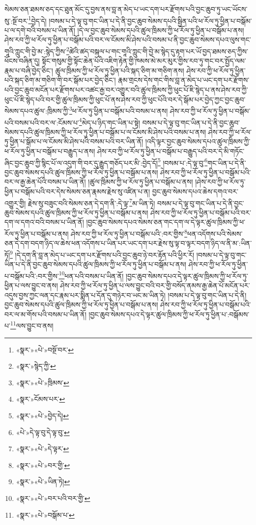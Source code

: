 སེམས་ཅན་ཐམས་ཅད་དང་ཐུན་མོང་དུ་བྱས་ནས་བླ་ན་མེད་པ་ཡང་དག་པར་རྫོགས་པའི་བྱང་ཆུབ་ཏུ་ཡང་ཡོངས་སུ་:སྔོ་བར་\footnote{«སྣར་»«པེ་»བསྔོ་བར་}བྱེད་དེ། །བསམ་པ་དེ་ལྟ་བུ་གང་ཡིན་པ་དེ་ནི་བྱང་ཆུབ་སེམས་དཔའི་སྦྱིན་པའི་ཕ་རོལ་ཏུ་ཕྱིན་པ་བསྒོམ་པ་ལ་དགེ་བའི་བསམ་པ་ཡིན་ནོ། །དེ་ལ་བྱང་ཆུབ་སེམས་དཔའི་ཚུལ་ཁྲིམས་ཀྱི་ཕ་རོལ་ཏུ་ཕྱིན་པ་བསྒོམ་པ་ནས། ཤེས་རབ་ཀྱི་ཕ་རོལ་ཏུ་ཕྱིན་པ་བསྒོམ་པའི་བར་ལ་ངོམས་མི་ཤེས་པའི་བསམ་པ་ནི་བྱང་ཆུབ་སེམས་དཔའ་ལུས་གང་གཱའི་ཀླུང་གི་བྱེ་མ་:སྙེད་ཀྱིས་\footnote{«སྣར་»སྙེད་ཀྱི་}ཚེའི་ཚད་བསྐལ་པ་གང་གཱའི་ཀླུང་གི་བྱེ་མ་སྙེད་དུ་རྟག་པར་ཡོ་བྱད་ཐམས་ཅད་ཀྱིས་ཕོངས་བཞིན་དུ། སྟོང་གསུམ་གྱི་སྟོང་ཆེན་པོའི་འཇིག་རྟེན་གྱི་ཁམས་མེ་མར་མུར་གྱིས་རབ་ཏུ་གང་བར་སྤྱོད་ལམ་རྣམ་པ་བཞི་བྱེད་ཅིང་། ཚུལ་ཁྲིམས་ཀྱི་ཕ་རོལ་ཏུ་ཕྱིན་པའི་སྐད་ཅིག་མ་གཅིག་ནས། ཤེས་རབ་ཀྱི་ཕ་རོལ་ཏུ་ཕྱིན་པའི་སྐད་ཅིག་མ་གཅིག་གི་བར་སྒོམ་པར་བྱེད་ཅིང་། རྣམ་གྲངས་དེས་གང་གིས་བླ་ན་མེད་པ་ཡང་དག་པར་རྫོགས་པའི་བྱང་ཆུབ་མངོན་པར་རྫོགས་པར་འཚང་རྒྱ་བར་འགྱུར་བའི་ཚུལ་ཁྲིམས་ཀྱི་ཕུང་པོ་ཇི་སྙེད་པ་ནས་ཤེས་རབ་ཀྱི་ཕུང་པོ་ཇི་སྙེད་པའི་བར་གྱི་ཚུལ་ཁྲིམས་ཀྱི་ཕུང་པོ་ནས་ཤེས་རབ་ཀྱི་ཕུང་པོའི་བར་དེ་སྒོམ་པར་བྱེད་ཀྱང་བྱང་ཆུབ་སེམས་དཔའ་ཚུལ་:ཁྲིམས་ཀྱི་\footnote{«སྣར་»«པེ་»ཁྲིམས་}ཕ་རོལ་ཏུ་ཕྱིན་པ་བསྒོམ་པའི་བསམ་པ་ནས། ཤེས་རབ་ཀྱི་ཕ་རོལ་ཏུ་ཕྱིན་པ་བསྒོམ་པའི་བསམ་པའི་བར་ལ་:ངོམས་པ་\footnote{«སྣར་»ངོམས་པར་}མེད་པ་ཉིད་གང་ཡིན་པ་སྟེ། བསམ་པ་དེ་ལྟ་བུ་གང་ཡིན་པ་དེ་ནི་བྱང་ཆུབ་སེམས་དཔའི་ཚུལ་ཁྲིམས་ཀྱི་ཕ་རོལ་ཏུ་ཕྱིན་པ་བསྒོམ་པ་ལ་ངོམས་མི་ཤེས་པའི་བསམ་པ་ནས། ཤེས་རབ་ཀྱི་ཕ་རོལ་ཏུ་ཕྱིན་པ་སྒོམ་པ་ལ་ངོམས་མི་ཤེས་པའི་བསམ་པའི་བར་ཡིན་ནོ། །འདི་ལྟར་བྱང་ཆུབ་སེམས་དཔའ་ཚུལ་ཁྲིམས་ཀྱི་ཕ་རོལ་ཏུ་ཕྱིན་པ་བསྒོམ་པ་བརྒྱུད་པ་ནས། ཤེས་རབ་ཀྱི་ཕ་རོལ་ཏུ་ཕྱིན་པ་བསྒོམ་པ་བརྒྱུད་པའི་བར་དེ་མི་གཏོང་ཞིང་བྱང་ཆུབ་ཀྱི་སྙིང་པོ་ལ་འདུག་གི་བར་དུ་རྒྱུད་གཅོད་པར་མི་:བྱེད་དོ།\footnote{«སྣར་»«པེ་»བྱེད་དེ།} །བསམ་པ་:དེ་ལྟ་བུ་\footnote{«པེ་»དེ་ལྟ་བུ་དེ་ལྟ་བུ་}གང་ཡིན་པ་དེ་ནི་བྱང་ཆུབ་སེམས་དཔའི་ཚུལ་ཁྲིམས་ཀྱི་ཕ་རོལ་ཏུ་ཕྱིན་པ་བསྒོམ་པ་ནས། ཤེས་རབ་ཀྱི་ཕ་རོལ་ཏུ་ཕྱིན་པ་བསྒོམ་པའི་བར་ལ་རྒྱ་ཆེན་པོའི་བསམ་པ་ཡིན་ནོ། །ཚུལ་ཁྲིམས་ཀྱི་ཕ་རོལ་ཏུ་ཕྱིན་པ་བསྒོམ་པ་ནས། །ཤེས་རབ་ཀྱི་ཕ་རོལ་ཏུ་ཕྱིན་པ་བསྒོམ་པའི་བར་དེས་སེམས་ཅན་རྣམས་རྗེས་སུ་འཛིན་པ་ན། བྱང་ཆུབ་སེམས་དཔའ་ཆེས་དགའ་བར་འགྱུར་གྱི། རྗེས་སུ་བཟུང་བའི་སེམས་ཅན་དེ་དག་ནི་:དེ་ལྟ་\footnote{«སྣར་»«པེ་»དེ་ལྟར་}མ་ཡིན་ཏེ། བསམ་པ་དེ་ལྟ་བུ་གང་ཡིན་པ་དེ་ནི་བྱང་ཆུབ་སེམས་དཔའི་ཚུལ་ཁྲིམས་ཀྱི་ཕ་རོལ་ཏུ་ཕྱིན་པ་བསྒོམ་པ་ནས། ཤེས་རབ་ཀྱི་ཕ་རོལ་ཏུ་ཕྱིན་པ་བསྒོམ་པའི་བར་དག་ལ་དགའ་བའི་བསམ་པ་ཡིན་ནོ། །བྱང་ཆུབ་སེམས་དཔའ་སེམས་ཅན་གང་དག་ལ་དེ་ལྟར་ཚུལ་ཁྲིམས་ཀྱི་ཕ་རོལ་ཏུ་ཕྱིན་པ་བསྒོམ་པ་ནས། ཤེས་རབ་ཀྱི་ཕ་རོལ་ཏུ་ཕྱིན་པ་བསྒོམ་པའི་:བར་གྱིས་\footnote{«སྣར་»«པེ་»བར་གྱི་}ཕན་འདོགས་པའི་སེམས་ཅན་དེ་དག་བདག་ཉིད་ལ་ཆེས་ཕན་འདོགས་པ་ཡིན་པར་ཡང་དག་པར་རྗེས་སུ་ལྟ་བ་ལྟར་བདག་ཉིད་ལ་ནི་མ་:ཡིན་ཏོ།\footnote{«སྣར་»«པེ་»ཡིན་ཏེ།} །དེ་དག་ནི་བླ་ན་མེད་པ་ཡང་དག་པར་རྫོགས་པའི་བྱང་ཆུབ་ཉེ་བར་རྟོན་པའི་ཕྱིར་རོ། །བསམ་པ་དེ་ལྟ་བུ་གང་ཡིན་པ་དེ་ནི་བྱང་ཆུབ་སེམས་དཔའི་ཚུལ་ཁྲིམས་ཀྱི་ཕ་རོལ་ཏུ་ཕྱིན་པ་བསྒོམ་པ་ནས། ཤེས་རབ་ཀྱི་ཕ་རོལ་ཏུ་ཕྱིན་པ་བསྒོམ་པའི་:བར་གྱིས་\footnote{«སྣར་»«པེ་»བར་པའི་བར་གྱི་}ཕན་པའི་བསམ་པ་ཡིན་ནོ། །བྱང་ཆུབ་སེམས་དཔའ་དེ་ལྟར་ཚུལ་ཁྲིམས་ཀྱི་ཕ་རོལ་ཏུ་ཕྱིན་པ་ལས་བྱུང་བ་ནས། ཤེས་རབ་ཀྱི་ཕ་རོལ་ཏུ་ཕྱིན་པ་ལས་བྱུང་བའི་བར་གྱི་བསོད་ནམས་རྒྱ་ཆེན་པོ་མངོན་པར་འདུས་བྱས་ཀྱང་ལན་དང་རྣམ་པར་སྨིན་པ་དོན་དུ་གཉེར་བ་ཡང་མ་ཡིན་ཏེ། །བསམ་པ་དེ་ལྟ་བུ་གང་ཡིན་པ་དེ་ནི། བྱང་ཆུབ་སེམས་དཔའི་ཚུལ་ཁྲིམས་ཀྱི་ཕ་རོལ་ཏུ་ཕྱིན་པ་བསྒོམ་པ་ནས། ཤེས་རབ་ཀྱི་ཕ་རོལ་ཏུ་ཕྱིན་པ་བསྒོམ་པའི་བར་ལ་མ་གོས་པའི་བསམ་པ་ཡིན་ནོ། །བྱང་ཆུབ་སེམས་དཔའ་དེ་ལྟར་ཚུལ་ཁྲིམས་ཀྱི་ཕ་རོལ་ཏུ་ཕྱིན་པ་:བསྒོམས་པ་\footnote{«སྣར་»«པེ་»བསྒོམ་པ་}ལས་བྱུང་བ་ནས། 